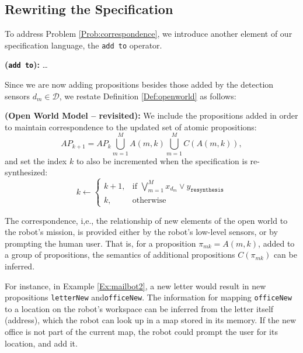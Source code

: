 \subsection{Rewriting the Specification} %

To address Problem \ref{Prob:correspondence}, we introduce another element of our specification language, the \texttt{add to} operator.

\begin{myDefinition}\label{Def:addto}
	\textbf{(\texttt{add to}):}
	\ldots
\end{myDefinition}

Since we are now adding propositions besides those added by the detection sensors $d_m \in \mathcal{D}$, we restate Definition \ref{Def:openworld} as follows:

\begin{myDefinition}\label{Def:openworld2}	
	\textbf{(Open World Model -- revisited):} We include the propositions added in order to maintain correspondence to the updated set of atomic propositions:
	\begin{equation}\label{Eq:updateAP2}
		AP_{k+1} = AP_k \bigcup_{m=1}^{M}A(m, k) \bigcup_{m=1}^{M}C(A(m, k)),
	\end{equation}
	and set the index $k$ to also be incremented when the specification is re-synthesized:
	\begin{equation*}
		k \leftarrow 
		\begin{cases}
			k + 1, & \text{if } \bigvee_{m=1}^{M} x_{d_m} \vee y_{\texttt{resynthesis}} \\
			k, & \text{otherwise}
		\end{cases}
	\end{equation*}
\end{myDefinition}

\begin{myAssumption}
	The correspondence, i,e., the relationship of new elements of the open world to the robot's mission, is provided either by the robot's low-level sensors, or by prompting the human user. That is, for a proposition $\pi_{mk} = A(m, k)$, added to a group of propositions, the semantics of additional propositions $C(\pi_{mk})$ can be inferred.
\end{myAssumption}

For instance, in Example \ref{Ex:mailbot2}, a new letter would result in new propositions \texttt{letterNew} and\texttt{officeNew}. The information for mapping \texttt{officeNew} to a location on the robot's workspace can be inferred from the letter itself (address), which the robot can look up in a map stored in its memory. If the new office is not part of the current map, the robot could prompt the user for its location, and add it.


